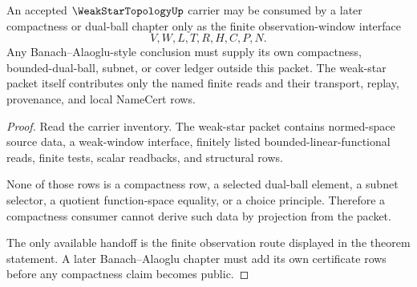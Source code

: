 \begin{theorem}
\label{thm:weak-star-topology-banach-alaoglu-boundary}
An accepted $\WeakStarTopologyUp$ carrier may be consumed by a later compactness or dual-ball chapter only as the finite observation-window interface
$$
V,W,L,T,R,H,C,P,N .
$$
Any Banach--Alaoglu-style conclusion must supply its own compactness, bounded-dual-ball, subnet, or cover ledger outside this packet. The weak-star packet itself contributes only the named finite reads and their transport, replay, provenance, and local NameCert rows.
\end{theorem}
\begin{proof}
Read the carrier inventory. The weak-star packet contains normed-space source data, a weak-window interface, finitely listed bounded-linear-functional reads, finite tests, scalar readbacks, and structural rows.

None of those rows is a compactness row, a selected dual-ball element, a subnet selector, a quotient function-space equality, or a choice principle. Therefore a compactness consumer cannot derive such data by projection from the packet.

The only available handoff is the finite observation route displayed in the theorem statement. A later Banach--Alaoglu chapter must add its own certificate rows before any compactness claim becomes public.
\end{proof}




